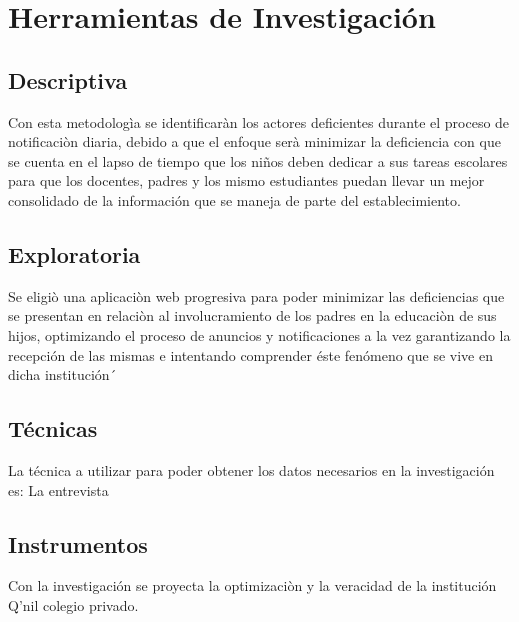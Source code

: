 \section{Herramientas de Investigación}
\subsection{Descriptiva}
\hspace{1.27cm}Con esta metodologìa se identificaràn los actores deficientes durante el proceso de notificaciòn diaria, debido a que el enfoque serà minimizar la deficiencia con que se cuenta en el lapso de tiempo que los niños deben dedicar a sus tareas escolares para que los docentes, padres y los mismo estudiantes puedan llevar un mejor consolidado de la información que se maneja de parte del establecimiento.
\subsection{Exploratoria}
\hspace{1.27cm}Se eligiò una aplicaciòn web progresiva para poder minimizar las deficiencias que se presentan en relaciòn al involucramiento de los padres en la educaciòn de sus hijos, optimizando el proceso de anuncios y notificaciones a la vez garantizando la recepción de las mismas e intentando comprender éste fenómeno que se vive en dicha institución´
\subsection{Técnicas}
\hspace{1.27cm}La técnica a utilizar para poder obtener los datos necesarios en la investigación es: La entrevista
\subsection{Instrumentos}
\hspace{1.27cm}Con la investigación se proyecta la optimizaciòn y la veracidad de la institución Q’nil colegio privado.